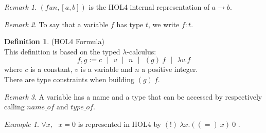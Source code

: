 \documentclass[a4paper, 11pt]{article}
\theoremstyle{plain}
\theoremstyle{definition}
\newtheorem*{mydef}{Definition}
\theoremstyle{remark}
\newtheorem*{remark}{Remark}
\newtheorem*{example}{Example}
\newcommand\sep{\mbox{ } | \mbox{ }}
\begin{document}
\begin{remark} 
$(fun,[a,b])$ is the HOL4 internal representation of $a \rightarrow b$.
\end{remark}

\begin{remark} 
To say that a variable $f$ has type $t$, we write $f:t$.
\end{remark}

\begin{mydef} (HOL4 Formula)
\\This definition is based on the typed $\lambda$-calculus:
\[ f,g := c \sep v \sep n \sep (g)\ f \sep \lambda v. f\]
where  $c$ is a constant, $v$ is a variable and $n$ a positive integer.
\\There are type constraints when building $(g)\ f$.
\end{mydef}

\begin{remark}
A variable has a name and a type that can be accessed by respectively calling $name\_of$ and $type\_of$.
\end{remark}

\begin{example}
$\forall x,\mbox{ } x = 0$ is represented in HOL4 by $(!)\ \lambda x. ((=)\ x)\ 0$ .
\end{example}
\end{document}
